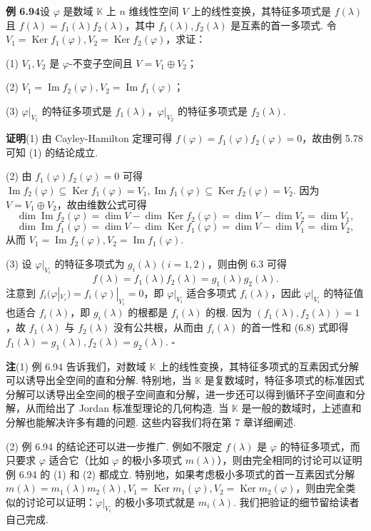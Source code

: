 \documentclass[UTF8,12pt,a4paper,fontset=fandol]{ctexart}
\begin{document}
\noindent\textbf{例 6.94}\quad 设 $\varphi$ 是数域 $\mathbb{K}$ 上 $n$ 维线性空间 $V$ 上的线性变换，其特征多项式是 $f(\lambda)$ 且 $f(\lambda)=f_1(\lambda)f_2(\lambda)$，其中 $f_1(\lambda),f_2(\lambda)$ 是互素的首一多项式. 令 $V_1=\operatorname{Ker}f_1(\varphi),V_2=\operatorname{Ker}f_2(\varphi)$，求证：

(1) $V_1,V_2$ 是 $\varphi$-不变子空间且 $V=V_1\oplus V_2$；

(2) $V_1=\operatorname{Im}f_2(\varphi),V_2=\operatorname{Im}f_1(\varphi)$；

(3) $\varphi|_{V_1}$ 的特征多项式是 $f_1(\lambda)$，$\varphi|_{V_2}$ 的特征多项式是 $f_2(\lambda)$.

\noindent\textbf{证明}\quad (1) 由 Cayley-Hamilton 定理可得 $f(\varphi)=f_1(\varphi)f_2(\varphi)=0$，故由例 5.78 可知 (1) 的结论成立.

(2) 由 $f_1(\varphi)f_2(\varphi)=0$ 可得 $\operatorname{Im}f_2(\varphi)\subseteq \operatorname{Ker}f_1(\varphi)=V_1,\operatorname{Im}f_1(\varphi)\subseteq\operatorname{Ker}f_2(\varphi)=V_2$. 因为 $V=V_1\oplus V_2$，故由维数公式可得
\[
\dim\operatorname{Im}f_2(\varphi)=\dim V-\dim\operatorname{Ker}f_2(\varphi)=\dim V-\dim V_2=\dim V_1,
\]
\[
\dim\operatorname{Im}f_1(\varphi)=\dim V-\dim\operatorname{Ker}f_1(\varphi)=\dim V-\dim V_1=\dim V_2,
\]
从而 $V_1=\operatorname{Im}f_2(\varphi),V_2=\operatorname{Im}f_1(\varphi)$.

(3) 设 $\varphi|_{V_i}$ 的特征多项式为 $g_i(\lambda)(i=1,2)$，则由例 6.3 可得
\begin{equation}
f(\lambda)=f_1(\lambda)f_2(\lambda)=g_1(\lambda)g_2(\lambda). \tag{6.8}
\end{equation}
注意到 $f_i(\varphi|_{V_i})=f_i(\varphi)|_{V_i}=0$，即 $\varphi|_{V_i}$ 适合多项式 $f_i(\lambda)$，因此 $\varphi|_{V_i}$ 的特征值也适合 $f_i(\lambda)$，即 $g_i(\lambda)$ 的根都是 $f_i(\lambda)$ 的根. 因为 $(f_1(\lambda),f_2(\lambda))=1$，故 $f_1(\lambda)$ 与 $f_2(\lambda)$ 没有公共根，从而由 $f_i(\lambda)$ 的首一性和 (6.8) 式即得 $f_1(\lambda)=g_1(\lambda),f_2(\lambda)=g_2(\lambda)$. $\square$

\noindent\textbf{注}\quad (1) 例 6.94 告诉我们，对数域 $\mathbb{K}$ 上的线性变换，其特征多项式的互素因式分解可以诱导出全空间的直和分解. 特别地，当 $\mathbb{K}$ 是复数域时，特征多项式的标准因式分解可以诱导出全空间的根子空间直和分解，进一步还可以得到循环子空间直和分解，从而给出了 Jordan 标准型理论的几何构造. 当 $\mathbb{K}$ 是一般的数域时，上述直和分解也能解决许多有趣的问题. 这些内容我们将在第 7 章详细阐述.

(2) 例 6.94 的结论还可以进一步推广. 例如不限定 $f(\lambda)$ 是 $\varphi$ 的特征多项式，而只要求 $\varphi$ 适合它（比如 $\varphi$ 的极小多项式 $m(\lambda)$），则由完全相同的讨论可以证明例 6.94 的 (1) 和 (2) 都成立. 特别地，如果考虑极小多项式的首一互素因式分解 $m(\lambda)=m_1(\lambda)m_2(\lambda),V_1=\operatorname{Ker}m_1(\varphi),V_2=\operatorname{Ker}m_2(\varphi)$，则由完全类似的讨论可以证明：$\varphi|_{V_i}$ 的极小多项式就是 $m_i(\lambda)$. 我们把验证的细节留给读者自己完成.
\end{document}

